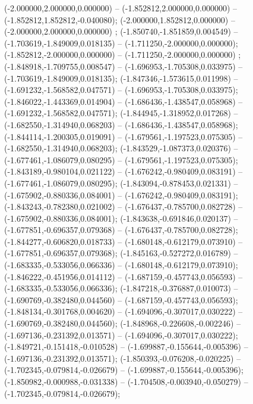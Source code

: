  (-2.000000,2.000000,0.000000) -- (-1.852812,2.000000,0.000000) -- (-1.852812,1.852812,-0.040080);
 (-2.000000,1.852812,0.000000) -- (-2.000000,2.000000,0.000000) ;
 (-1.850740,-1.851859,0.004549) -- (-1.703619,-1.849009,0.018135) -- (-1.711250,-2.000000,0.000000);
 (-1.852812,-2.000000,0.000000) -- (-1.711250,-2.000000,0.000000) ;
 (-1.848918,-1.709755,0.008547) -- (-1.696953,-1.705308,0.033975) -- (-1.703619,-1.849009,0.018135);
 (-1.847346,-1.573615,0.011998) -- (-1.691232,-1.568582,0.047571) -- (-1.696953,-1.705308,0.033975);
 (-1.846022,-1.443369,0.014904) -- (-1.686436,-1.438547,0.058968) -- (-1.691232,-1.568582,0.047571);
 (-1.844945,-1.318952,0.017268) -- (-1.682550,-1.314940,0.068203) -- (-1.686436,-1.438547,0.058968);
 (-1.844114,-1.200305,0.019091) -- (-1.679561,-1.197523,0.075305) -- (-1.682550,-1.314940,0.068203);
 (-1.843529,-1.087373,0.020376) -- (-1.677461,-1.086079,0.080295) -- (-1.679561,-1.197523,0.075305);
 (-1.843189,-0.980104,0.021122) -- (-1.676242,-0.980409,0.083191) -- (-1.677461,-1.086079,0.080295);
 (-1.843094,-0.878453,0.021331) -- (-1.675902,-0.880336,0.084001) -- (-1.676242,-0.980409,0.083191);
 (-1.843243,-0.782380,0.021002) -- (-1.676437,-0.785700,0.082728) -- (-1.675902,-0.880336,0.084001);
 (-1.843638,-0.691846,0.020137) -- (-1.677851,-0.696357,0.079368) -- (-1.676437,-0.785700,0.082728);
 (-1.844277,-0.606820,0.018733) -- (-1.680148,-0.612179,0.073910) -- (-1.677851,-0.696357,0.079368);
 (-1.845163,-0.527272,0.016789) -- (-1.683335,-0.533056,0.066336) -- (-1.680148,-0.612179,0.073910);
 (-1.846222,-0.451956,0.014112) -- (-1.687159,-0.457743,0.056593) -- (-1.683335,-0.533056,0.066336);
 (-1.847218,-0.376887,0.010073) -- (-1.690769,-0.382480,0.044560) -- (-1.687159,-0.457743,0.056593);
 (-1.848134,-0.301768,0.004620) -- (-1.694096,-0.307017,0.030222) -- (-1.690769,-0.382480,0.044560);
 (-1.848968,-0.226608,-0.002246) -- (-1.697136,-0.231392,0.013571) -- (-1.694096,-0.307017,0.030222);
 (-1.849721,-0.151418,-0.010528) -- (-1.699887,-0.155644,-0.005396) -- (-1.697136,-0.231392,0.013571);
 (-1.850393,-0.076208,-0.020225) -- (-1.702345,-0.079814,-0.026679) -- (-1.699887,-0.155644,-0.005396);
 (-1.850982,-0.000988,-0.031338) -- (-1.704508,-0.003940,-0.050279) -- (-1.702345,-0.079814,-0.026679);
